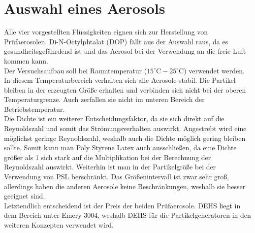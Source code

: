\section{Auswahl eines Aerosols}
Alle vier vorgestellten Fl\"{u}ssigkeiten eignen sich zur Herstellung von Pr\"{u}faerosolen. Di-N-Octylphtalat (DOP) f\"{a}llt aus der Auswahl raus, da es gesundheitsgef\"{a}hrdend ist und das Aerosol bei der Verwendung an die freie Luft kommen kann.\\
Der Versuchsaufbau soll bei Raumtemperatur (\(15^\circ\text{C} - 25^\circ\text{C}\)) verwendet werden. In diesem Temperaturbereich verhalten sich alle Aerosole stabil. Die Partikel bleiben in der erzeugten Gr\"{o}{\ss}e erhalten und verbinden sich nicht bei der oberen Temperaturgrenze. Auch zerfallen sie nicht im unteren Bereich der Betriebstemperatur.\\
Die Dichte ist ein weiterer Entscheidungsfaktor, da sie sich direkt auf die Reynoldszahl und somit das Str\"{o}mungsverhalten auswirkt. Angestrebt wird eine m\"{o}glichst geringe Reynoldszahl, weshalb auch die Dichte m\"{o}glich gering bleiben sollte. Somit kann man Poly Styrene Latex auch ausschlie{\ss}en, da eine Dichte gr\"{o}{\ss}er als 1 sich stark auf die Multiplikation bei der Berechnung der Reynoldszahl auswirkt. Weiterhin ist man in der Partikelgr\"{o}{\ss}e bei der Verwendung von PSL berschr\"{a}nkt. Das Gr\"{o}{\ss}enintervall ist zwar sehr gro{\ss}, allerdings haben die anderen Aerosole keine Beschr\"{a}nkungen, weshalb sie besser geeignet sind.\\
Letztendlich entscheidend ist der Preis der beiden Pr\"{u}faerosole. DEHS liegt in dem Bereich unter Emery 3004, weshalb DEHS f\"{u}r die Partikelgeneratoren in den weiteren Konzepten verwendet wird.